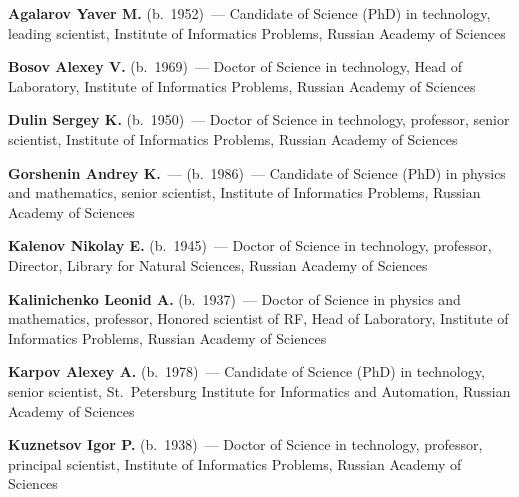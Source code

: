 \begin{multicols}{2}

\noindent
\textbf{Agalarov Yaver M.} (b.\ 1952)~--- Candidate of Science (PhD)
in technology, 
leading scientist, Institute of Informatics Problems, Russian Academy of Sciences

\vspace*{5pt}


  \noindent
\textbf{Bosov Alexey V.} (b.\ 1969)~--- Doctor of Science in technology, Head of
Laboratory, Institute of Informatics Problems, Russian Academy of Sciences

\vspace*{5pt}


\noindent
\textbf{Dulin Sergey K.} (b.\ 1950)~--- Doctor of Science in technology, 
professor, senior scientist, Institute of Informatics Problems, Russian Academy of Sciences

\vspace*{5pt}

\noindent
\textbf{Gorshenin Andrey K.}~--- (b.\ 1986)~--- Candidate of Science (PhD)
in physics and mathematics,
senior scientist, Institute of Informatics Problems, Russian Academy of Sciences

\vspace*{5pt}

\noindent
\textbf{Kalenov Nikolay E.}  (b.\ 1945)~--- Doctor of Science in technology,
professor, Director, Library for Natural Sciences,  Russian Academy of Sciences 

\vspace*{5pt}

\noindent
\textbf{Kalinichenko Leonid A.} (b.\ 1937)~--- Doctor of Science in physics and mathematics, 
professor, Honored scientist of RF, 
Head of Laboratory, Institute of Informatics Problems, Russian Academy of Sciences 

\vspace*{5pt}

\noindent
\textbf{Karpov Alexey A.} (b.\ 1978)~--- Candidate of Science (PhD) in technology, 
senior scientist, St.\ Petersburg Institute for
Informatics and Automation,  Russian Academy of Sciences

\vspace*{5pt}

\noindent
\textbf{Kuznetsov Igor P.} (b.\ 1938)~--- Doctor of Science in technology, 
professor, principal scientist, Institute of Informatics Problems, Russian Academy of Sciences

\vspace*{5pt}



\end{multicols}
